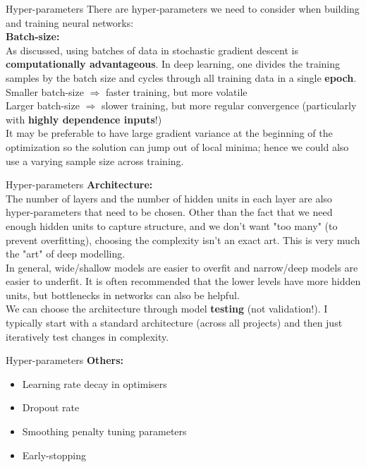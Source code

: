 \documentclass{beamer}
\begin{document}
\begin{frame}{Hyper-parameters}
There are hyper-parameters we need to consider when building and training neural networks:\\
\textbf{Batch-size:}\\
As discussed, using batches of data in stochastic gradient descent is \textbf{computationally advantageous}. In deep learning, one divides the training samples by the batch size and cycles through all training data in a single \textbf{epoch}.\\
Smaller batch-size $\Rightarrow$ faster training, but more volatile\\
Larger batch-size $\Rightarrow$ slower training, but more regular convergence (particularly with \textbf{highly dependence inputs}!)\\
It may be preferable to have large gradient variance at the beginning of the optimization so the solution can jump out of local minima; hence we could also use a varying sample size across training.
\end{frame}

\begin{frame}{Hyper-parameters}
\textbf{Architecture:}\\
The number of layers and the number of hidden units in each layer are also hyper-parameters that need to be chosen. Other than the fact that we need enough hidden units to capture structure, and we don't want "too many" (to prevent overfitting), choosing the complexity isn't an exact art. This is very much the "art" of deep modelling.\\

In general, wide/shallow models are easier to overfit and narrow/deep models are easier to underfit. It is often recommended that the lower levels have more hidden units, but bottlenecks in networks can also be helpful.\\
We can choose the architecture through model \textbf{testing} (not validation!). I typically start with a standard architecture (across all projects) and then just iteratively test changes in complexity.
\end{frame}
\begin{frame}{Hyper-parameters}
\textbf{Others:}\\
\begin{itemize}
\item Learning rate decay in optimisers
\item Dropout rate
\item Smoothing penalty tuning parameters
\item Early-stopping
\end{itemize}
\end{frame}
\end{document}
